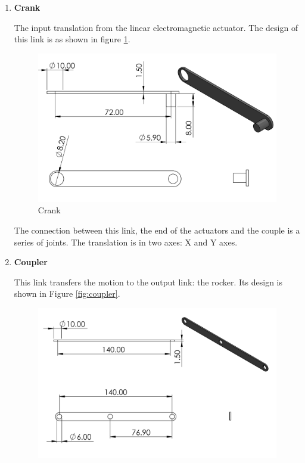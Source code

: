 \begin{enumerate}
    \begin{enumerate}
        \item \textbf{Crank}
        \par
        The input translation from the linear electromagnetic actuator. The design of this link is as shown in figure \ref{fig:crank}.
        \begin{figure}[H]
            \centering
            \includegraphics{Figures/KLink3.PNG}
            \caption{Crank}
            \label{fig:crank}
        \end{figure}
        The connection between this link, the end of the actuators and the couple is a series of joints. The translation is in two axes: X and Y axes.
        \item \textbf{Coupler}
        \par
        This link transfers the motion to the output link: the rocker. Its design is shown in Figure \ref{fig:coupler}.
        \begin{figure}[H]
            \centering
            \includegraphics{Figures/KLink1.PNG}

\end{figure}
\end{enumerate}
\end{enumerate}
